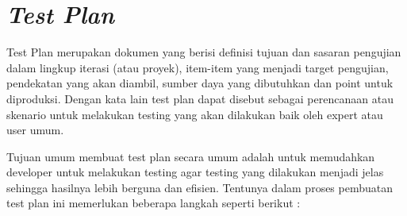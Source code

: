 \section {\textit{Test Plan}}
\par Test Plan merupakan dokumen yang berisi definisi tujuan dan sasaran pengujian dalam lingkup iterasi (atau proyek), item-item yang menjadi target pengujian, pendekatan yang akan diambil, sumber daya yang dibutuhkan dan point untuk diproduksi. Dengan kata lain test plan dapat disebut sebagai perencanaan atau skenario untuk melakukan testing yang akan dilakukan baik oleh expert atau user umum. 
\par Tujuan umum membuat test plan secara umum adalah untuk memudahkan developer untuk melakukan testing agar testing yang dilakukan menjadi jelas sehingga hasilnya lebih berguna dan efisien. Tentunya dalam proses pembuatan test plan ini memerlukan beberapa langkah seperti berikut : \citep{guru99}
